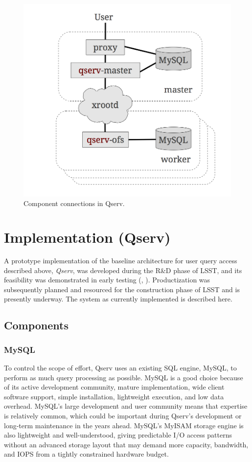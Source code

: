 \documentclass[DM,toc]{lsstdoc}
\begin{document}
\begin{figure}[H]
\centering
\includegraphics{_static/qserve_components.png}
\caption{Component connections in Qserv.}
\end{figure}

\section{Implementation (Qserv)}\label{implementation}

A prototype implementation of the baseline architecture for user query
access described above, \emph{Qserv}, was developed during the R\&D phase of
LSST, and its feasibility was demonstrated in early testing (,
). Productization was subsequently planned and resourced for
the construction phase of LSST and is presently underway.  The system as
currently implemented is described here.

\subsection{Components}\label{components}

\subsubsection{MySQL}\label{mysql}

To control the scope of effort, Qserv uses an existing SQL engine, MySQL, to
perform as much query processing as possible. MySQL is a good choice because
of its active development community, mature implementation, wide client
software support, simple installation, lightweight execution, and low data
overhead. MySQL's large development and user community means that expertise is
relatively common, which could be important during Qserv's development or
long-term maintenance in the years ahead. MySQL's MyISAM storage engine is
also lightweight and well-understood, giving predictable I/O access patterns
without an advanced storage layout that may demand more capacity, bandwidth,
and IOPS from a tightly constrained hardware budget.
\end{document}
